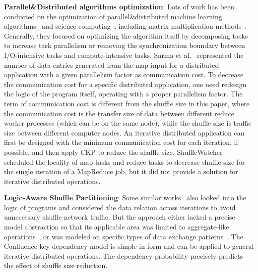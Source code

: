 \documentclass[10pt,journal,compsoc]{IEEEtran}
\begin{document}
\textbf{Parallel\&Distributed algorithms optimization}: Lots of work has been conducted on the optimization of parallel\&distributed machine learning algorithms~\cite{bekkerman2011scaling} and science computing~\cite{kiran2013verification, mensink2012metric}, including matrix multiplication methods~\cite{buluc2012parallel, ballard2012communication}. 
Generally, they focused on optimizing the algorithm itself by decomposing tasks to increase task parallelism or removing the synchronization boundary between I/O-intensive tasks and compute-intensive tasks. 
Sarma et al.~\cite{Sarma:2013:ULB} represented the number of data entries generated from the map input for a distributed application with a given parallelism factor as communication cost. 
To decrease the communication cost for a specific distributed application, one need redesign the logic of the program itself, operating with a proper parallelism factor. 
The term of communication cost is different from the shuffle size in this paper, where the communication cost is the transfer size of data between different reduce worker processes (which can be on the same node), while the shuffle size is traffic size between different computer nodes. 
An iterative distributed application can first be designed with the minimum communication cost for each iteration, if possible, and then apply CKP to reduce the shuffle size.
ShuffleWatcher~\cite{faraz2014shufflewatcher} scheduled the locality of map tasks and reduce tasks to decrease shuffle size for the single 
iteration of a MapReduce job, but it did not provide a solution for iterative distributed operations. 

\textbf{Logic-Aware Shuffle Partitioning}: 
Some similar works~\cite{zhou2010scope, zhang2012shuffle} also looked into the logic of programs and considered the data relation across iterations to avoid unnecessary shuffle network traffic. 
But the approach either lacked a precise model abstraction so that 
its applicable area was limited to aggregate-like operations~\cite{zhang2012shuffle}, or was modeled on specific types of data exchange patterns~\cite{zhou2010scope}. The Confluence key dependency model is simple in form
and can be applied to general iterative distributed operations. 
The dependency probability precisely predicts the effect of 
shuffle size reduction.
\end{document}
